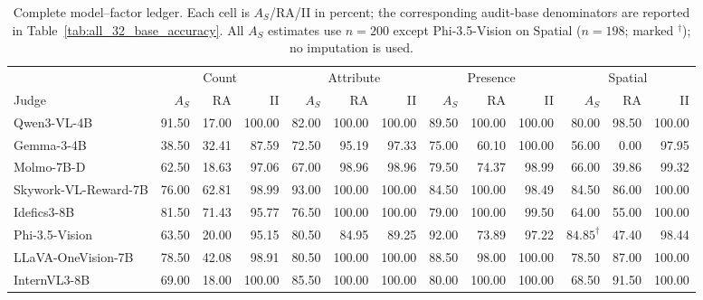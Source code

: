 \begin{table}[t]
\centering
\scriptsize
\caption{Complete model--factor ledger. Each cell is $A_S$/RA/II in percent;
the corresponding audit-base denominators are reported in
Table~\ref{tab:all_32_base_accuracy}. All $A_S$ estimates use $n=200$ except
Phi-3.5-Vision on Spatial ($n=198$; marked $^{\dagger}$); no imputation is used.}
\label{tab:all_32_results}
\setlength{\tabcolsep}{3.2pt}
\begin{tabular}{lrrrrrrrrrrrr}
\toprule
& \multicolumn{3}{c}{Count} & \multicolumn{3}{c}{Attribute}
& \multicolumn{3}{c}{Presence} & \multicolumn{3}{c}{Spatial} \\
Judge & $A_S$ & RA & II & $A_S$ & RA & II & $A_S$ & RA & II & $A_S$ & RA & II \\
\midrule
Qwen3-VL-4B & 91.50 & 17.00 & 100.00 & 82.00 & 100.00 & 100.00 & 89.50 & 100.00 & 100.00 & 80.00 & 98.50 & 100.00 \\
Gemma-3-4B & 38.50 & 32.41 & 87.59 & 72.50 & 95.19 & 97.33 & 75.00 & 60.10 & 100.00 & 56.00 & 0.00 & 97.95 \\
Molmo-7B-D & 62.50 & 18.63 & 97.06 & 67.00 & 98.96 & 98.96 & 79.50 & 74.37 & 98.99 & 66.00 & 39.86 & 99.32 \\
Skywork-VL-Reward-7B & 76.00 & 62.81 & 98.99 & 93.00 & 100.00 & 100.00 & 84.50 & 100.00 & 98.49 & 84.50 & 86.00 & 100.00 \\
Idefics3-8B & 81.50 & 71.43 & 95.77 & 76.50 & 100.00 & 100.00 & 79.00 & 100.00 & 99.50 & 64.00 & 55.00 & 100.00 \\
Phi-3.5-Vision & 63.50 & 20.00 & 95.15 & 80.50 & 84.95 & 89.25 & 92.00 & 73.89 & 97.22 & $84.85^{\dagger}$ & 47.40 & 98.44 \\
LLaVA-OneVision-7B & 78.50 & 42.08 & 98.91 & 80.50 & 100.00 & 100.00 & 88.50 & 98.00 & 100.00 & 78.50 & 87.00 & 100.00 \\
InternVL3-8B & 69.00 & 18.00 & 100.00 & 85.50 & 100.00 & 100.00 & 80.00 & 100.00 & 100.00 & 68.50 & 91.50 & 100.00 \\
\bottomrule
\end{tabular}
\end{table}

